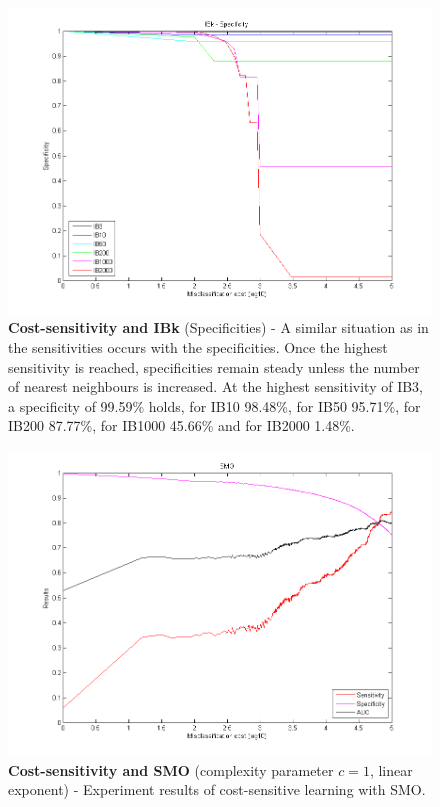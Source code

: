 \newpage
\begin{figure}[h]
\includegraphics[scale=0.65]{img/IBk_spec.png}
\caption{\textbf{Cost-sensitivity and IBk} (Specificities) - A similar situation as in the sensitivities occurs with the specificities. Once the highest sensitivity is reached, specificities remain steady unless the number of nearest neighbours is increased. At the highest sensitivity of IB3, a specificity of 99.59\% holds, for IB10 98.48\%, for IB50 95.71\%, for IB200 87.77\%, for IB1000 45.66\% and for IB2000 1.48\%.}
\end{figure}

\newpage
\begin{figure}[h]
\includegraphics[scale=0.65]{img/smo.png}
\caption{\textbf{Cost-sensitivity and SMO} (complexity parameter $c=1$, linear exponent) - Experiment results of cost-sensitive learning with SMO.}
\end{figure}

